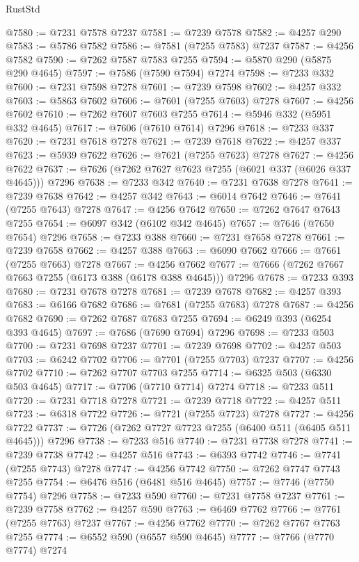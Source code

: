\begin{lexlean}{RustStd}
\begin{coremodule}
@7580 := @7231 @7578 @7237
@7581 := @7239 @7578
@7582 := @4257 @290
@7583 := @5786 @7582
@7586 := @7581 (@7255 @7583) @7237
@7587 := @4256 @7582
@7590 := @7262 @7587 @7583 @7255
@7594 := @5870 @290 (@5875 @290 @4645)
@7597 := @7586 (@7590 @7594) @7274
@7598 := @7233 @332
@7600 := @7231 @7598 @7278
@7601 := @7239 @7598
@7602 := @4257 @332
@7603 := @5863 @7602
@7606 := @7601 (@7255 @7603) @7278
@7607 := @4256 @7602
@7610 := @7262 @7607 @7603 @7255
@7614 := @5946 @332 (@5951 @332 @4645)
@7617 := @7606 (@7610 @7614) @7296
@7618 := @7233 @337
@7620 := @7231 @7618 @7278
@7621 := @7239 @7618
@7622 := @4257 @337
@7623 := @5939 @7622
@7626 := @7621 (@7255 @7623) @7278
@7627 := @4256 @7622
@7637 := @7626 (@7262 @7627 @7623 @7255 (@6021 @337 (@6026 @337 @4645))) @7296
@7638 := @7233 @342
@7640 := @7231 @7638 @7278
@7641 := @7239 @7638
@7642 := @4257 @342
@7643 := @6014 @7642
@7646 := @7641 (@7255 @7643) @7278
@7647 := @4256 @7642
@7650 := @7262 @7647 @7643 @7255
@7654 := @6097 @342 (@6102 @342 @4645)
@7657 := @7646 (@7650 @7654) @7296
@7658 := @7233 @388
@7660 := @7231 @7658 @7278
@7661 := @7239 @7658
@7662 := @4257 @388
@7663 := @6090 @7662
@7666 := @7661 (@7255 @7663) @7278
@7667 := @4256 @7662
@7677 := @7666 (@7262 @7667 @7663 @7255 (@6173 @388 (@6178 @388 @4645))) @7296
@7678 := @7233 @393
@7680 := @7231 @7678 @7278
@7681 := @7239 @7678
@7682 := @4257 @393
@7683 := @6166 @7682
@7686 := @7681 (@7255 @7683) @7278
@7687 := @4256 @7682
@7690 := @7262 @7687 @7683 @7255
@7694 := @6249 @393 (@6254 @393 @4645)
@7697 := @7686 (@7690 @7694) @7296
@7698 := @7233 @503
@7700 := @7231 @7698 @7237
@7701 := @7239 @7698
@7702 := @4257 @503
@7703 := @6242 @7702
@7706 := @7701 (@7255 @7703) @7237
@7707 := @4256 @7702
@7710 := @7262 @7707 @7703 @7255
@7714 := @6325 @503 (@6330 @503 @4645)
@7717 := @7706 (@7710 @7714) @7274
@7718 := @7233 @511
@7720 := @7231 @7718 @7278
@7721 := @7239 @7718
@7722 := @4257 @511
@7723 := @6318 @7722
@7726 := @7721 (@7255 @7723) @7278
@7727 := @4256 @7722
@7737 := @7726 (@7262 @7727 @7723 @7255 (@6400 @511 (@6405 @511 @4645))) @7296
@7738 := @7233 @516
@7740 := @7231 @7738 @7278
@7741 := @7239 @7738
@7742 := @4257 @516
@7743 := @6393 @7742
@7746 := @7741 (@7255 @7743) @7278
@7747 := @4256 @7742
@7750 := @7262 @7747 @7743 @7255
@7754 := @6476 @516 (@6481 @516 @4645)
@7757 := @7746 (@7750 @7754) @7296
@7758 := @7233 @590
@7760 := @7231 @7758 @7237
@7761 := @7239 @7758
@7762 := @4257 @590
@7763 := @6469 @7762
@7766 := @7761 (@7255 @7763) @7237
@7767 := @4256 @7762
@7770 := @7262 @7767 @7763 @7255
@7774 := @6552 @590 (@6557 @590 @4645)
@7777 := @7766 (@7770 @7774) @7274

\end{coremodule}
\end{lexlean}

